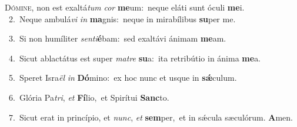 \lettrine{\initial\textcolor{\initialcolor}{D}}{ómine,} non est exaltá\textit{tum} \textit{cor} \textbf{me}\-um:~\star neque eláti sunt óculi \textbf{me}\-i.\\
{\numbfont\textcolor{\numbcolor}{~2.}}~Neque ambulá\textit{vi} \textit{in} \textbf{ma}\-gnis:~\star neque in mirabílibus \textbf{su}\-per me.\par
{\numbfont\textcolor{\numbcolor}{~3.}}~Si non humíliter \textit{sen}\-\textit{ti}\textbf{é}bam:~\star sed exaltávi ánimam \textbf{me}\-am.\par
{\numbfont\textcolor{\numbcolor}{~4.}}~Sicut ablactátus est super \textit{ma}\-\textit{tre} \textbf{su}\-a:~\star ita retribútio in ánima \textbf{me}\-a.\par
{\numbfont\textcolor{\numbcolor}{~5.}}~Speret Isra\textit{ël} \textit{in} \textbf{Dó}\-mino:~\star ex hoc nunc et usque in \textbf{sǽ}\-culum.\par
{\numbfont\textcolor{\numbcolor}{~6.}}~Glória Pa\-\textit{tri}\-, \textit{et} \textbf{Fí}\-lio,~\star et Spirítui \textbf{Sanc}\-to.\par
{\numbfont\textcolor{\numbcolor}{~7.}}~Sicut erat in princípio, et \textit{nunc}\-, \textit{et} \textbf{sem}\-per,~\star et in sǽcula sæculórum. \textbf{A}\-men.\par
